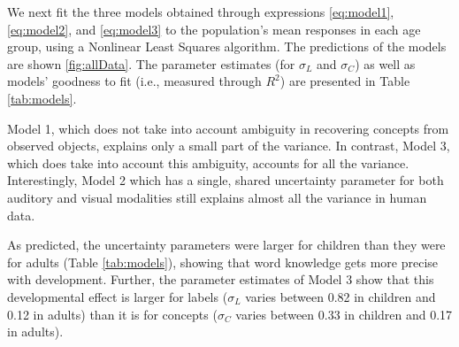\documentclass[english,,man]{apa6}
\begin{document}
\begin{table}

\caption{\label{tab:models}Characteristics and performance of the models used in this study. Value ranges represent 95\% confidence intervals.}
\centering
{}
\end{table}

We next fit the three models obtained through expressions \ref{eq:model1}, \ref{eq:model2}, and \ref{eq:model3} to the population's mean responses in each age group, using a Nonlinear Least Squares algorithm. The predictions of the models are shown \ref{fig:allData}. The parameter estimates (for \(\sigma_L\) and \(\sigma_C\)) as well as models' goodness to fit (i.e., measured through \(R^2\)) are presented in Table \ref{tab:models}.

Model 1, which does not take into account ambiguity in recovering concepts from observed objects, explains only a small part of the variance. In contrast, Model 3, which does take into account this ambiguity, accounts for all the variance. Interestingly, Model 2 which has a single, shared uncertainty parameter for both auditory and visual modalities still explains almost all the variance in human data.

As predicted, the uncertainty parameters were larger for children than they were for adults (Table \ref{tab:models}), showing that word knowledge gets more precise with development. Further, the parameter estimates of Model 3 show that this developmental effect is larger for labels (\(\sigma_L\) varies between 0.82 in children and 0.12 in adults) than it is for concepts (\(\sigma_C\) varies between 0.33 in children and 0.17 in adults).
\end{document}
